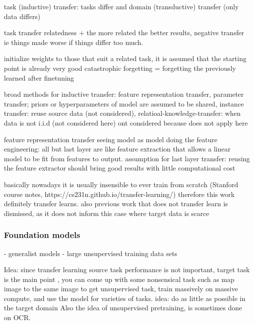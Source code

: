 \documentclass{article}
\begin{document}
task (inductive) transfer: tasks differ and domain (transductive) transfer (only data differs)

task transfer relatedness + the more related the better results, negative transfer ie things made worse if 
things differ too much.

initialize weights to those that suit a related task, it is assumed that the starting point is already very good
catastrophic forgetting = forgetting the previously learned after finetuning

broad methods for inductive transfer: feature representation transfer, parameter transfer; priors or hyperparameters of model are assumed to be shared,
instance transfer: reuse source data (not considered), relatioal-knowledge-transfer: when data is not i.i.d (not considered here)
ont considered because does not apply here

feature representation transfer
seeing model as model doing the feature engineering: all but last layer are like 
feature extraction that allows a linear model to be fit from features to output. 
assumption for last layer transfer: reusing the feature extractor should bring good results with little computational cost

basically nowadays it is usually insensible to ever train from scratch (Stanford course notes, https://cs231n.github.io/transfer-learning/)
therefore this work definitely transfer learns. also previous work that does not transfer learn is dismissed, 
as it does not inform this case where target data is scarce

\subsubsection{Foundation models}

- generalist models
	- large unsupervised training data sets

Idea: since transfer learning source task performance is not important, target task is the main point \cite{transferlearning_survey}, 
you can come up with some nonsensical task such as map image to the same image to get unsupervised task, train 
massively on massive compute, and use the model for varieties of tasks. idea: do as little as possible in the target domain
Also the idea of unsupervised pretraining, is sometimes done on OCR.

\end{document}
